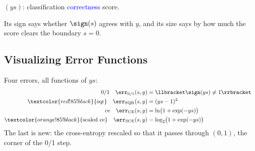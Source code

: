 \begin{moral}
    \((ys)\): classification \textcolor{blue}{correctness}
    \textcolor{orange!85!black}{score}.
\end{moral}

Its sign says whether \(\sign(s)\) agrees with \(y\), and its size says by how
much the score clears the boundary \(s = 0\).

\subsection{Visualizing Error Functions}

Four errors, all functions of \(ys\):
\begin{align*}
    \text{0/1} \quad \err_{0/1}(s, y) &= \llbracket \sign(ys) \neq 1
    \rrbracket\\
    \textcolor{red!85!black}{\text{sqr}} \quad \err_{\mathrm{SQR}}(s, y) &=
    (ys - 1)^2\\
    \text{ce} \quad \err_{\mathrm{CE}}(s, y) &= \ln \bigl( 1 + \exp(-ys)
    \bigr)\\
    \textcolor{orange!85!black}{\text{scaled ce}} \quad
    \err_{\mathrm{SCE}}(s, y) &= \log_2 \bigl( 1 + \exp(-ys) \bigr)
\end{align*}
The last is new: the cross-entropy rescaled so that it passes through \((0,
1)\), the corner of the 0/1 step.

